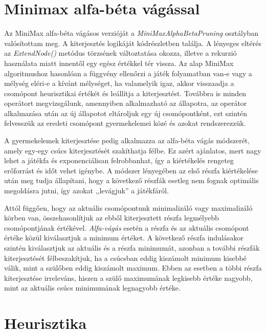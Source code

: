\documentclass[
]{thesis-ekf}
\theoremstyle{definition}
\theoremstyle{remark}
\begin{document}
\section{Minimax alfa-béta vágással} \label{minimaxalphabeta}

Az MiniMax alfa-béta vágásos verzióját a \emph{MiniMaxAlphaBetaPruning} osztályban valósítottam meg. A kiterjesztés logikáját  kódrészletben találja. A lényeges eltérés az \emph{ExtendNode()} metódus törzsének változtatása okozza, illetve a rekurzió használata miatt innentől egy egész értékkel tér vissza. Az alap MiniMax algoritmushoz hasonlóan a függvény ellenőrzi a játék folyamatban van-e vagy a mélység eléri-e a kívánt mélységet, ha valamelyik igaz, akkor visszaadja a csomópont heurisztikai értékét és leállítja a kiterjesztést. Továbbra is minden operátort megvizsgálunk, amennyiben alkalmazható az állapotra, az operátor alkalmazása után az új állapotot eltároljuk egy új csomópontként, ezt szintén felvesszük az eredeti csomópont gyermekelemei közé és azokat rendszerezzük.

A gyermekelemek kiterjesztése pedig alkalmazza az alfa-béta vágás módszerét, amely egy-egy csúcs kiterjesztését szakíthatja félbe. Ez azért ajánlatos, mert nagy lehet a játékfa és exponenciálisan felrobbanhat, így a kiértékelés rengeteg erőforrást és időt vehet igénybe. A módszer lényegében az első részfa kiértékelése után meg tudja állapítani, hogy a következő részfák esetleg nem fognak optimális megoldásra jutni, így azokat ,,levágjuk'' a játékfáról.



Attól függően, hogy az aktuális csomópontunk minimalizáló vagy maximalizáló körben van, összehasonlítjuk az ebből kiterjesztett részfa legmélyebb csomópontjának értékével. \emph{Alfa-vágás} esetén a részfa és az aktuális csomópont értéke közül kiválasztjuk a minimum értéket. A következő részfa indulásakor szintén kiválasztjuk az aktuális és a részfa minimumát, azonban a további részfák kiterjesztését félbeszakítjuk, ha a csúcsban eddig kiszámolt minimum kisebbé válik, mint a szülőben eddig kiszámolt maximum. Ebben az esetben a többi részfa kiterjesztése irreleváns, hiszen a szülő maximumának legkisebb értéke nagyobb, mint az aktuális csúcs minimumának legnagyobb értéke. \cite[5.6. fejezet]{KovasznaiKusper} 

\section{Heurisztika} \label{heuristics}
\end{document}
